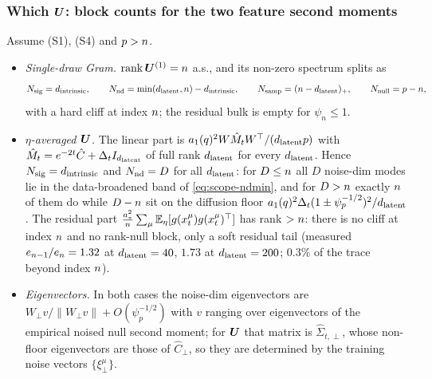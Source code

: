 \subsubsection{Which $\bm{U}$: block counts for the two feature second moments}

\begin{proposition}\label{prop:scope-counts}
Assume (S1), (S4) and $p>n$.
\begin{itemize}
\item[(a)] \emph{Single-draw Gram.} $\operatorname{rank}\bm{U}^{(1)}=n$ a.s., and its non-zero spectrum splits as
\begin{equation}\label{eq:scope-counts}
N_{\rm sig}=d_{\mathrm{intrinsic}},\qquad N_{\rm nd}=\min(d_{\mathrm{latent}},n)-d_{\mathrm{intrinsic}},\qquad N_{\rm samp}=(n-d_{\mathrm{latent}})_+,\qquad N_{\rm null}=p-n ,
\end{equation}
with a hard cliff at index $n$; the residual bulk is empty for $\psi_n\le1$.
\item[(b)] \emph{$\eta$-averaged $\bm{U}$.} The linear part is $a_1(q)^2W\hat M_tW^\top/(d_{\mathrm{latent}}p)$ with $\hat M_t=e^{-2t}\hat C+\Delta_tI_{d_{\mathrm{latent}}}$ of full rank $d_{\mathrm{latent}}$ for every $d_{\mathrm{latent}}$. Hence $N_{\rm sig}=d_{\mathrm{intrinsic}}$ and $N_{\rm nd}=D$ for all $d_{\mathrm{latent}}$: for $D\le n$ all $D$ noise-dim modes lie in the data-broadened band of \eqref{eq:scope-ndmin}, and for $D>n$ exactly $n$ of them do while $D-n$ sit on the diffusion floor $a_1(q)^2\Delta_t(1\pm\psi_p^{-1/2})^2/d_{\mathrm{latent}}$. The residual part $\frac{a_*^2}{n}\sum_\mu\mathbb{E}_\eta[g(x_t^\mu)g(x_t^\mu)^\top]$ has rank $>n$: there is no cliff at index $n$ and no rank-null block, only a soft residual tail (measured $e_{n-1}/e_{n}=1.32$ at $d_{\mathrm{latent}}=40$, $1.73$ at $d_{\mathrm{latent}}=200$; $0.3\%$ of the trace beyond index $n$).
\item[(c)] \emph{Eigenvectors.} In both cases the noise-dim eigenvectors are $W_\perp v/\|W_\perp v\|+O(\psi_p^{-1/2})$ with $v$ ranging over eigenvectors of the empirical noised null second moment; for $\bm{U}$ that matrix is $\hat\Sigma_{t,\perp}$, whose non-floor eigenvectors are those of $\hat C_\perp$, so they are determined by the training noise vectors $\{\xi^\mu_\perp\}$.
\end{itemize}
\end{proposition}
